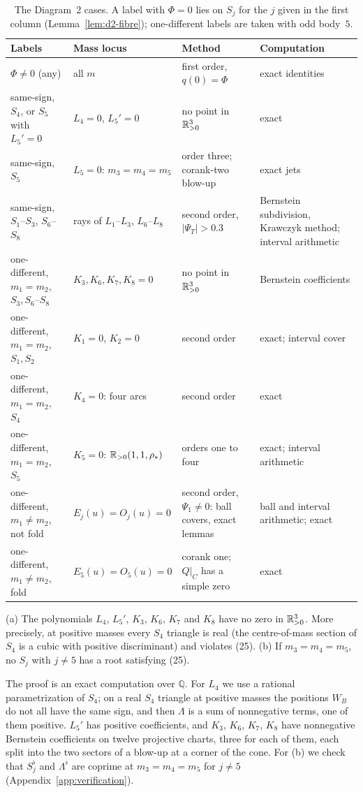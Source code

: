 \begin{table}[ht]
\centering
\footnotesize
\setlength{\tabcolsep}{3pt}
\begin{tabular}{p{2.5cm}p{2.5cm}p{3.3cm}p{3.4cm}}
\hline
Labels & Mass locus & Method & Computation \\
\hline
$\Phi\ne0$ (any) & all $m$ & first order, $q(0)=\Phi$ & exact identities \\
same-sign, $S_4$, or $S_5$ with $L_5'=0$ & $L_4=0$, $L_5'=0$ & no point in $\mathbb{R}_{>0}^3$ & exact \\
same-sign, $S_5$ & $L_5=0$: $m_3=m_4=m_5$ & order three; corank-two blow-up & exact jets \\
same-sign, $S_1$--$S_3$, $S_6$--$S_8$ & rays of $L_1$--$L_3$, $L_6$--$L_8$ & second order,
$|\Psi_T|>0.3$ & Bernstein subdivision, Krawczyk method; interval arithmetic \\
\hline
one-different, $m_1=m_2$, $S_3,S_6$--$S_8$ & $K_3,K_6,K_7,K_8=0$ & no point in $\mathbb{R}_{>0}^3$ &
Bernstein coefficients \\
one-different, $m_1=m_2$, $S_1,S_2$ & $K_1=0$, $K_2=0$ & second order & exact; interval cover \\
one-different, $m_1=m_2$, $S_4$ & $K_4=0$: four arcs & second order & exact \\
one-different, $m_1=m_2$, $S_5$ & $K_5=0$: $\mathbb{R}_{>0}(1,1,\rho_*)$ & orders one to four &
exact; interval arithmetic \\
\hline
one-different, $m_1\ne m_2$, not fold & $E_j(u)=O_j(u)=0$ & second order, $\Psi_1\ne0$: ball
covers, exact lemmas & ball and interval arithmetic; exact \\
one-different, $m_1\ne m_2$, fold & $E_5(u)=O_5(u)=0$ & corank one; $Q|_C$ has a simple zero &
exact \\
\hline
\end{tabular}
\caption{The Diagram~2 cases.  A label with $\Phi=0$ lies on $S_j$ for the $j$ given in the
first column (Lemma~\ref{lem:d2-fibre}); one-different labels are taken with odd body~$5$.}
\label{tab:d2-cases}
\end{table}

\begin{lemma}\label{lem:d2-empty}
\textup{(a)} The polynomials $L_4$, $L_5'$, $K_3$, $K_6$, $K_7$ and $K_8$ have no zero in $\mathbb{R}_{>0}^3$.
More precisely, at positive masses every $S_4$ triangle is real \textup{(}the centre-of-mass
section of $S_4$ is a cubic with positive discriminant\textup{)} and violates \textup{(25)}.
\textup{(b)} If $m_3=m_4=m_5$, no $S_j$ with $j\ne5$ has a root satisfying \textup{(25)}.
\end{lemma}
The proof is an exact computation over $\mathbb Q$.  For $L_4$ we use a rational parametrization
of $S_4$; on a real $S_4$ triangle at positive masses the positions $W_B$ do not all have the same
sign, and then $\Lambda$ is a sum of nonnegative terms, one of them positive.  $L_5'$ has
positive coefficients, and $K_3$, $K_6$, $K_7$, $K_8$ have nonnegative Bernstein coefficients on
twelve projective charts, three for each of them, each split into the two sectors of a blow-up
at a corner of the cone.  For (b) we check that $S_j^\flat$ and $\Lambda^\flat$ are coprime at
$m_3=m_4=m_5$ for $j\ne5$ (Appendix~\ref{app:verification}).

